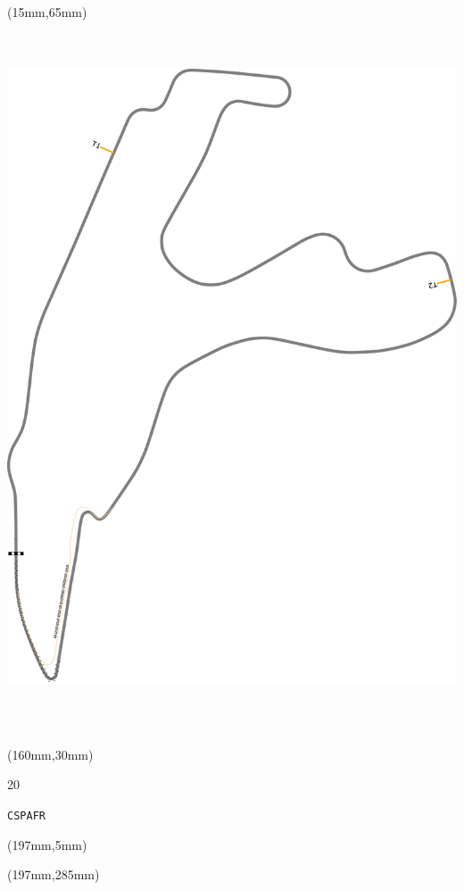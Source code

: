 \begin{textblock*}{185mm}(15mm,65mm)%
\centering
\mbox{\includegraphics[width=185mm,height=210mm,keepaspectratio]{PT/CSPAFR.pdf}}
\end{textblock*}
\begin{textblock*}{40mm}(160mm,30mm)%
\Large
\par{} 
\par20 
\par\hfill\tiny\tt CSPAFR\\
\end{textblock*}
\begin{textblock*}{20mm}(197mm,5mm)%
\fbox{\thepage}
\label{CSPAFR}
\end{textblock*}
\begin{textblock*}{20mm}(197mm,285mm)%
\fbox{\thepage}
\end{textblock*}

